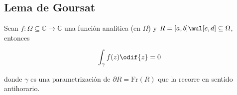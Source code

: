 \documentclass[../main.tex]{subfiles}
\begin{document}
\subsection{Lema de Goursat}

\begin{lemma}\label{lemma:lem-goursat-v1}
    Sean \(f \colon \Omega \subseteq \mathbb{C} \to \mathbb{C}\) una función analítica
    (en \(\Omega\)) y \(R = [a, b] \mul [c, d] \subseteq \Omega\), entonces

    \begin{equation*}
        \int_{\gamma}^{}f(z)\odif{z} = 0
    \end{equation*}

    donde \(\gamma\) es una parametrización de \(\partial R =
    \mathrm{Fr}(R)\) que la recorre en
    sentido antihorario.
\end{lemma}
\end{document}
